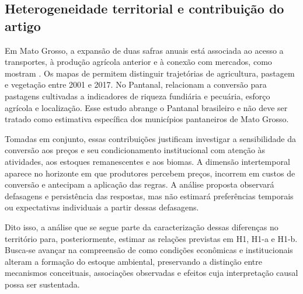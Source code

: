 \subsection{Heterogeneidade territorial e contribuição do artigo}

Em Mato Grosso, a expansão de duas safras anuais está associada ao acesso a transportes, à produção agrícola anterior e à conexão com mercados, como mostram . Os mapas de  permitem distinguir trajetórias de agricultura, pastagem e vegetação entre 2001 e 2017. No Pantanal,  relacionam a conversão para pastagens cultivadas a indicadores de riqueza fundiária e pecuária, esforço agrícola e localização. Esse estudo abrange o Pantanal brasileiro e não deve ser tratado como estimativa específica dos municípios pantaneiros de Mato Grosso.

Tomadas em conjunto, essas contribuições justificam investigar a sensibilidade da conversão aos preços e seu condicionamento institucional com atenção às atividades, aos estoques remanescentes e aos biomas. A dimensão intertemporal aparece no horizonte em que produtores percebem preços, incorrem em custos de conversão e antecipam a aplicação das regras. A análise proposta observará defasagens e persistência das respostas, mas não estimará preferências temporais ou expectativas individuais a partir dessas defasagens.

Dito isso, a análise que se segue parte da caracterização dessas diferenças no território para, posteriormente, estimar as relações previstas em H1, H1-a e H1-b. Busca-se avançar na compreensão de como condições econômicas e institucionais alteram a formação do estoque ambiental, preservando a distinção entre mecanismos conceituais, associações observadas e efeitos cuja interpretação causal possa ser sustentada.

